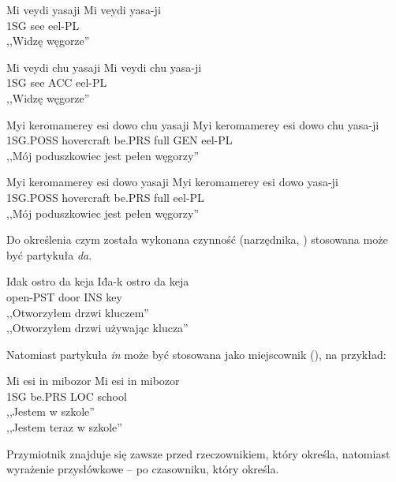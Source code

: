 \begin{spacing}{1.1}
\begin{exe}
	\ex
	\trans Mi veydi yasaji
	\gll  Mi veydi yasa-ji \\
	  1SG see eel-PL \\
	\glt  ,,Widzę węgorze''
\end{exe}

\begin{exe}
	\ex
	\trans Mi veydi chu yasaji
	\gll  Mi veydi chu yasa-ji \\
	  1SG see ACC eel-PL \\
	\glt  ,,Widzę węgorze''
\end{exe}

\begin{exe}
	\ex
	\trans Myi keromamerey esi dowo chu yasaji
	\gll  Myi keromamerey esi dowo chu yasa-ji \\
	  1SG.POSS hovercraft be.PRS full GEN eel-PL \\
	\glt  ,,Mój poduszkowiec jest pełen węgorzy''
\end{exe}

\begin{exe}
	\ex
	\trans Myi keromamerey esi dowo yasaji
	\gll  Myi keromamerey esi dowo yasa-ji \\
	  1SG.POSS hovercraft be.PRS full eel-PL \\
	\glt  ,,Mój poduszkowiec jest pełen węgorzy''
\end{exe}

Do określenia czym została wykonana czynność (narzędnika, \Ins{})
stosowana może być partykuła \emph{da}.

\begin{exe}
	\ex
	\trans Id́ak ostro da keja
	\gll  Id́a-k ostro da keja \\
	  open-PST door INS key \\
	\glt  ,,Otworzyłem drzwi kluczem'' \\ ,,Otworzyłem drzwi używając klucza''
\end{exe}

Natomiast partykuła \emph{in} może być stosowana jako miejscownik
(\Loc{}), na przykład:

\begin{exe}
	\ex
	\trans Mi esi in mibozor
	\gll  Mi esi in mibozor \\
	  1SG be.PRS LOC school \\
	\glt  ,,Jestem w szkole'' \\ ,,Jestem teraz w szkole''
\end{exe}

Przymiotnik znajduje się zawsze przed rzeczownikiem, który określa, natomiast
wyrażenie przysłówkowe -- po czasowniku, który określa.


\end{spacing}
